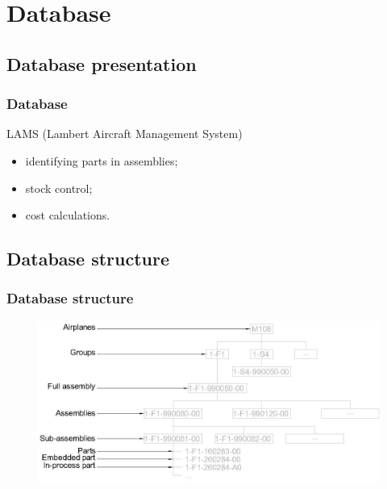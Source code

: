 \documentclass{beamer}
\begin{document}

\section{Database}
\subsection{Database presentation}

\begin{frame}\frametitle{Database}
LAMS (Lambert Aircraft Management System)
\begin{itemize}
\item identifying parts in assemblies;
\item stock control;
\item cost calculations.
\end{itemize}

\end{frame}

\subsection{Database structure}
\begin{frame}\frametitle{Database structure}
\begin{figure}[ht!]
	\begin{center}
		\includegraphics[width=11.5cm]{pics/PIC024.jpg}
		\label{fig:PIC024}
	\end{center}
\end{figure}
\end{frame}
\end{document}
